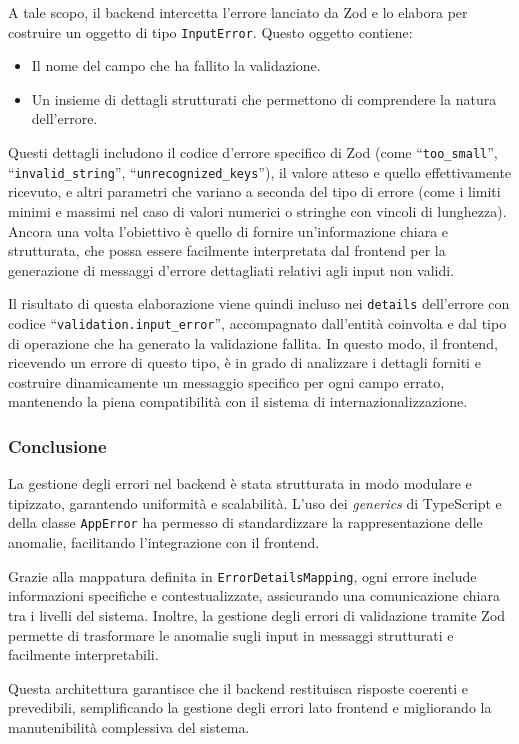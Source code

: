 A tale scopo, il backend intercetta l’errore lanciato da Zod e lo elabora per costruire un oggetto di tipo \texttt{InputError}. Questo oggetto contiene:
\begin{itemize}
  \item Il nome del campo che ha fallito la validazione.
  \item Un insieme di dettagli strutturati che permettono di comprendere la natura dell'errore.
\end{itemize}
Questi dettagli includono il codice d'errore specifico di Zod (come ``\texttt{too\_small}'', ``\texttt{invalid\_string}'', ``\texttt{unrecognized\_keys}''), il valore atteso e quello effettivamente ricevuto, e altri parametri che variano a seconda del tipo di errore (come i limiti minimi e massimi nel caso di valori numerici o stringhe con vincoli di lunghezza). Ancora una volta l'obiettivo è quello di fornire un’informazione chiara e strutturata, che possa essere facilmente interpretata dal frontend per la generazione di messaggi d’errore dettagliati relativi agli input non validi.

Il risultato di questa elaborazione viene quindi incluso nei \texttt{details} dell’errore con codice ``\texttt{validation.input\_error}'', accompagnato dall’entità coinvolta e dal tipo di operazione che ha generato la validazione fallita. In questo modo, il frontend, ricevendo un errore di questo tipo, è in grado di analizzare i dettagli forniti e costruire dinamicamente un messaggio specifico per ogni campo errato, mantenendo la piena compatibilità con il sistema di internazionalizzazione.

\subsubsection{Conclusione}
La gestione degli errori nel backend è stata strutturata in modo modulare e tipizzato, garantendo uniformità e scalabilità. L’uso dei \textit{generics} di TypeScript e della classe \texttt{AppError} ha permesso di standardizzare la rappresentazione delle anomalie, facilitando l’integrazione con il frontend.

Grazie alla mappatura definita in \texttt{ErrorDetailsMapping}, ogni errore include informazioni specifiche e contestualizzate, assicurando una comunicazione chiara tra i livelli del sistema. Inoltre, la gestione degli errori di validazione tramite Zod permette di trasformare le anomalie sugli input in messaggi strutturati e facilmente interpretabili.

Questa architettura garantisce che il backend restituisca risposte coerenti e prevedibili, semplificando la gestione degli errori lato frontend e migliorando la manutenibilità complessiva del sistema.

